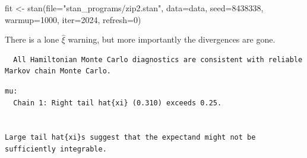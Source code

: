 \documentclass[
  letterpaper,
  DIV=11,
  numbers=noendperiod]{scrartcl}
\newenvironment{Shaded}{\begin{snugshade}}{\end{snugshade}}
\newcommand{\AttributeTok}[1]{\textcolor[rgb]{0.40,0.45,0.13}{#1}}
\newcommand{\DecValTok}[1]{\textcolor[rgb]{0.68,0.00,0.00}{#1}}
\newcommand{\FunctionTok}[1]{\textcolor[rgb]{0.28,0.35,0.67}{#1}}
\newcommand{\NormalTok}[1]{\textcolor[rgb]{0.00,0.23,0.31}{#1}}
\newcommand{\OtherTok}[1]{\textcolor[rgb]{0.00,0.23,0.31}{#1}}
\newcommand{\SpecialCharTok}[1]{\textcolor[rgb]{0.37,0.37,0.37}{#1}}
\newcommand{\StringTok}[1]{\textcolor[rgb]{0.13,0.47,0.30}{#1}}
\begin{document}
\begin{Shaded}
\begin{Highlighting}[]
\NormalTok{fit }\OtherTok{\textless{}{-}} \FunctionTok{stan}\NormalTok{(}\AttributeTok{file=}\StringTok{"stan\_programs/zip2.stan"}\NormalTok{,}
            \AttributeTok{data=}\NormalTok{data, }\AttributeTok{seed=}\DecValTok{8438338}\NormalTok{,}
            \AttributeTok{warmup=}\DecValTok{1000}\NormalTok{, }\AttributeTok{iter=}\DecValTok{2024}\NormalTok{, }\AttributeTok{refresh=}\DecValTok{0}\NormalTok{)}
\end{Highlighting}
\end{Shaded}

There is a lone \(\hat{\xi}\) warning, but more importantly the
divergences are gone.

\begin{Shaded}
\end{Shaded}

\begin{verbatim}
  All Hamiltonian Monte Carlo diagnostics are consistent with reliable
Markov chain Monte Carlo.
\end{verbatim}

\begin{Shaded}
\end{Shaded}

\begin{verbatim}
mu:
  Chain 1: Right tail hat{xi} (0.310) exceeds 0.25.


Large tail hat{xi}s suggest that the expectand might not be
sufficiently integrable.
\end{verbatim}
\end{document}
